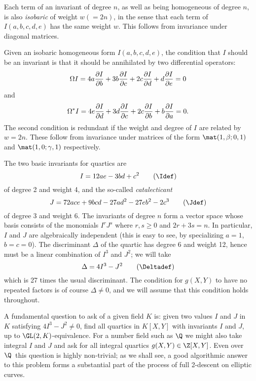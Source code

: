 Each term of an invariant of degree $n$, as well as being homogeneous
of degree $n$, is also {\it isobaric\/} of weight $w(=2n)$, in the
sense that each term of $I(a,b,c,d,e)$ has the same weight $w$.  
This follows from invariance under diagonal matrices.

Given an isobaric homogeneous form $I(a,b,c,d,e)$, the condition that
$I$ should be an invariant is that it should be annihilated by two
differential operators:
$$
  \Omega I = 4a\frac{\partial I}{\partial b} + 3b\frac{\partial I}{\partial c} 
           + 2c\frac{\partial I}{\partial d} +  d\frac{\partial I}{\partial e} = 0
$$
and
$$
  \Omega^* I = 4e\frac{\partial I}{\partial d} + 3d\frac{\partial I}{\partial c} 
             + 2c\frac{\partial I}{\partial b} +  b\frac{\partial I}{\partial a} = 0.
$$
The second condition is redundant if the weight and degree of $I$ are
related by $w=2n$.  These follow from invariance under matrices of
the form $\mat(1,\beta;0,1)$ and $\mat(1,0;\gamma,1)$ respectively.

The two basic invariants for quartics are \neweq\Idef
$$
   I = 12ae-3bd+c^2 \tag\Idef
$$
of degree 2 and weight 4, and the so-called {\it catalecticant} \neweq\Jdef
$$
  J =  72ace+9bcd-27ad^2-27eb^2-2c^3 \tag\Jdef
$$
of degree 3 and weight 6.  The invariants of degree $n$ form a vector
space whose basis consists of the monomials $I^rJ^s$ where $r,s\ge0$
and $2r+3s=n$.  In particular, $I$ and $J$ are algebraically
independent (this is easy to see, by specializing $a=1$, $b=c=0$).
The discriminant $\Delta$ of the quartic has degree 6 and weight 12,
hence must be a linear combination of $I^3$ and $J^2$; we will take
\neweq\Deltadef
$$
  \Delta = 4I^3-J^2 \tag\Deltadef
$$
which is 27 times the usual discriminant.  The condition for $g(X,Y)$
to have no repeated factors is of course $\Delta\not=0$, and we will
assume that this condition holds throughout.

A fundamental question to ask of a given field $K$ is: given two
values $I$ and $J$ in $K$ satisfying $4I^3-J^2\not=0$, find all
quartics in $K[X,Y]$ with invariants $I$ and $J$, up to
$\GL(2,K)$-equivalence.  For a number field such as $\Q$ we might also
take integral $I$ and $J$ and ask for all integral quartics
$g(X,Y)\in\Z[X,Y]$.  Even over $\Q$\ this question is highly
non-trivial; as we shall see, a good algorithmic answer to this
problem forms a substantial part of the process of full 2-descent on
elliptic curves.

\neweq\pdef
\neweq\rdef
\neweq\qdef
\neweq\semisyz
\neweq\covardef
\neweq\gfourdef
\neweq\gsixdef
\neweq\covarsyz

